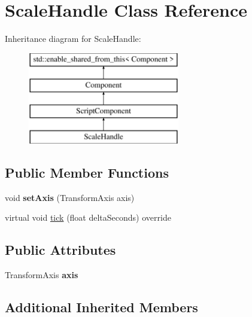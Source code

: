 \hypertarget{class_scale_handle}{}\section{Scale\+Handle Class Reference}
\label{class_scale_handle}
Inheritance diagram for Scale\+Handle\+:\begin{figure}[H]
\begin{center}
\leavevmode
\includegraphics[height=4.000000cm]{class_scale_handle}
\end{center}
\end{figure}
\subsection*{Public Member Functions}
\begin{DoxyCompactItemize}
\item 
\hypertarget{class_scale_handle_a945c152809d742987665716a5421264e}{}void {\bfseries set\+Axis} (Transform\+Axis axis)\label{class_scale_handle_a945c152809d742987665716a5421264e}

\item 
virtual void \hyperlink{class_scale_handle_a524669abeef7f0f13edf8e3fd041d44d}{tick} (float delta\+Seconds) override
\end{DoxyCompactItemize}
\subsection*{Public Attributes}
\begin{DoxyCompactItemize}
\item 
\hypertarget{class_scale_handle_af601f274be1e551cf3788cd5868fe3c4}{}Transform\+Axis {\bfseries axis}\label{class_scale_handle_af601f274be1e551cf3788cd5868fe3c4}

\end{DoxyCompactItemize}
\subsection*{Additional Inherited Members}


